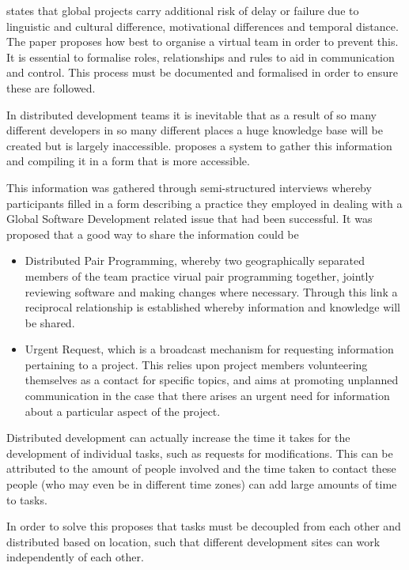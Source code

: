 \documentclass{l4proj}
\begin{document}
\citet{casey10virtual} states that global projects carry additional risk of delay or failure due to linguistic and cultural difference, motivational differences and temporal distance.  The paper proposes how best to organise a virtual team in order to prevent this.  It is essential to formalise roles, relationships and rules to aid in communication and control.  This process must be documented and formalised in order to ensure these are followed. 

In distributed development teams it is inevitable that as a result of so many different developers in so many different places a huge knowledge base will be created but is largely inaccessible.  \citet{bass07collaborative} proposes a system to gather this information and compiling it in a form that is more accessible.

This information was gathered through semi-structured interviews whereby participants filled in a form describing a practice they employed in dealing with a Global Software Development related issue that had been successful.  It was proposed that a good way to share the information could be

\begin{itemize}
\item Distributed Pair Programming, whereby two geographically separated members of the team practice virual pair programming together, jointly reviewing software and making changes where necessary.  Through this link a reciprocal relationship is established whereby information and knowledge will be shared.
\item Urgent Request, which is a broadcast mechanism for requesting information pertaining to a project.  This relies upon project members volunteering themselves as a contact for specific topics, and aims at promoting unplanned communication in the case that there arises an urgent need for information about a particular aspect of the project.
\end{itemize}


Distributed development can actually increase the time it takes for the development of individual tasks, such as requests for modifications.  This can be attributed to the amount of people involved and the time taken to contact these people (who may even be in different time zones) can add large amounts of time to tasks.  

In order to solve this \citet{herbsleb03empirical} proposes that tasks must be decoupled from each other and distributed based on location, such that different development sites can work independently of each other.
\end{document}

